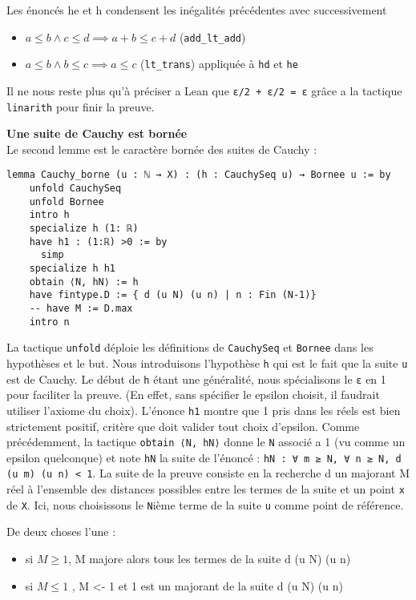 \documentclass[a4paper, 12pt]{article}
\newcommand{\lean}[1]{\texttt{#1}}
\begin{document}
Les énoncés he et h condensent les inégalités précédentes avec successivement
\begin{itemize}
    \item $a \leq b \land c\leq d \implies a+b \leq c+d$ (\lean{add_lt_add})
    \item $a \leq b \land b \leq c \implies a\leq c$ (\lean{lt_trans}) appliquée à \lean{hd} et \lean{he}
\end{itemize}

Il ne nous reste plus qu'à préciser a Lean que \lean{ε/2 + ε/2 = ε} grâce a la tactique \lean{linarith} pour finir la preuve.

\vspace{\baselineskip}
\textbf{Une suite de Cauchy est bornée}\\

Le second lemme est le caractère bornée des suites de Cauchy :

\begin{verbatim}
lemma Cauchy_borne (u : ℕ → X) : (h : CauchySeq u) → Bornee u := by
    unfold CauchySeq
    unfold Bornee
    intro h
    specialize h (1: ℝ)
    have h1 : (1:ℝ) >0 := by
      simp
    specialize h h1
    obtain ⟨N, hN⟩ := h
    have fintype.D := { d (u N) (u n) | n : Fin (N-1)}
    -- have M := D.max
    intro n
\end{verbatim}


La tactique \lean{unfold} déploie les définitions de \lean{CauchySeq} et \lean{Bornee} dans les hypothèses et le but. Nous introduisons l'hypothèse \lean{h} qui est le fait que la suite \lean{u} est de Cauchy. Le début de \lean{h} étant une généralité, nous spécialisons le \lean{ε} en 1 pour faciliter la preuve. (En effet, sans spécifier le epsilon choisit, il faudrait utiliser l'axiome du choix). L'énonce \lean{h1} montre que 1 pris dans les réels est bien strictement positif, critère que doit valider tout choix d'epsilon. Comme précédemment, la tactique \lean{obtain ⟨N, hN⟩} donne le \lean{N} associé a 1 (vu comme un epsilon quelconque) et note \lean{hN} la suite de l'énoncé : \lean{hN : ∀ m ≥ N, ∀ n ≥ N, d (u m) (u n) < 1}. La suite de la preuve consiste en la recherche d un majorant M réel à l'ensemble des distances possibles entre les termes de la suite et un point \lean{x} de \lean{X}. Ici, nous choisissons le \lean{N}ième terme de la suite \lean{u} comme point de référence.

De deux choses l'une :
\begin{itemize}
    \item si $M \geq 1$, M majore alors tous les termes de la suite d (u N) (u n)
    \item si $M \leq  1$ , M <- 1 et 1 est un majorant de la suite d (u N) (u n)
\end{itemize}
\end{document}
